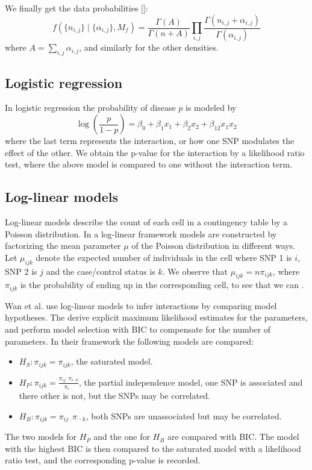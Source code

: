 \documentclass{bioinfo}
\begin{document}
\begin{methods}
We finally get the data probabilities []:
$$ f( \{n_{i,j}\} \mid \{ \alpha_{i,j} \}, M_f) = \frac{ \Gamma \left( A \right) }{ \Gamma\left( n + A \right) } \prod_{i,j} \frac{ \Gamma( n_{i,j} + \alpha_{i,j} ) }{ \Gamma( \alpha_{i,j} ) } $$
where $A = \sum_{i,j} \alpha_{i,j}$, and similarly for the other densities.

\subsection{Logistic regression}
In logistic regression the probability of disease $p$ is modeled by
$$ \log \left( \frac{p}{1-p} \right ) = \beta_0 + \beta_1 x_1 + \beta_2 x_2 + \beta_{12} x_1 x_2 $$
where the last term represents the interaction, or how one SNP modulates the effect of the other. We obtain the p-value for the interaction by a likelihood ratio test, where the above model is compared to one without the interaction term.
\subsection{Log-linear models}
Log-linear models describe the count of each cell in a contingency table by a Poisson distribution. In a log-linear framework models are constructed by factorizing the mean parameter $\mu$ of the Poisson distribution in different ways. Let $\mu_{ijk}$ denote the expected number of individuals in the cell where SNP 1 is $i$, SNP 2 is $j$ and the case/control status is $k$. We observe that $\mu_{ijk} = n \pi_{ijk}$, where $\pi_{ijk}$ is the probability of ending up in the corresponding cell, to see that we can .

Wan et al. use log-linear models to infer interactions by comparing model hypotheses. The derive explicit maximum likelihood estimates for the parameters, and perform model selection with BIC to compensate for the number of parameters. In their framework the following models are compared:
\begin{itemize}
\item $ H_S : \pi_{ijk} = \pi_{ijk} $, the saturated model.
\item $ H_P : \pi_{ijk} = \frac{ \pi_{ ij\cdot }\pi_{ i \cdot k } }{ \pi_{ i \cdot \cdot } } $, the partial independence model, one SNP is associated and there other is not, but the SNPs may be correlated.
\item $ H_B : \pi_{ijk} = \pi_{ij\cdot} \pi_{\cdot \cdot k} $, both SNPs are unassociated but may be correlated.
\end{itemize}
The two models for $H_P$ and the one for $H_B$ are compared with BIC. The model with the highest BIC is then compared to the saturated model with a likelihood ratio test, and the corresponding p-value is recorded.
\end{methods}
\end{document}
